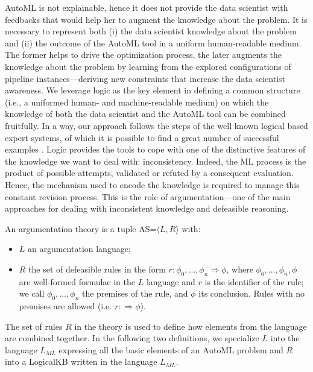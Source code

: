 AutoML is not explainable, hence it does not provide the data scientist with feedbacks that would help her to augment the knowledge about the problem.
It is necessary to represent both (i) the data scientist knowledge about the problem and (ii) the outcome of the AutoML tool in a uniform human-readable medium.
The former helps to drive the optimization process,
the later augments the knowledge about the problem by learning from the explored configurations of pipeline instances---deriving new constraints that increase the data scientist awareness.
We leverage logic as the key element in defining a common structure (i.e., a uniformed human- and machine-readable medium) on which the knowledge of both the data scientist and the AutoML tool can be combined fruitfully.
In a way, our approach follows the steps of the well known logical based expert systems, of which it is possible to find a great number of successful examples \cite{tan17es}.
Logic provides the tools to cope with one of the distinctive features of the knowledge we want to deal with: inconsistency. Indeed, the ML process is the product of possible attempts, validated or refuted by a consequent evaluation. Hence, the mechanism used to encode the knowledge is required to manage this constant revision process.
This is the role of argumentation---one of the main approaches for dealing with inconsistent knowledge and defeasible reasoning. 

\begin{definition}\label{system}
An argumentation theory is a tuple AS=$\langle L, R \rangle$ with:
\begin{itemize}
    \item $L$ an argumentation language;
    \item $R$ the set of defeasible rules in the form $r : \phi_0,\ldots, \phi_n \Rightarrow \phi$, where $\phi_0,\ldots, \phi_n,\phi$ are well-formed formulae in the $L$ language and $r$ is the identifier of the rule; we call $\phi_0,\ldots, \phi_n$ the premises of the rule, and $\phi$ its conclusion.
    Rules with no premises are allowed (i.e. $r : \Rightarrow \phi$).
\end{itemize}
\end{definition}

The set of rules $R$ in the theory is used to define how elements from the language are combined together.
In the following two definitions, we specialize $L$ into the language $L_{ML}$ expressing all the basic elements of an AutoML problem and $R$ into a LogicalKB written in the language $L_{ML}$.

